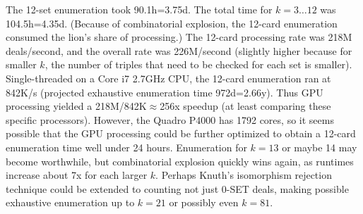 \documentclass[10pt]{amsart}
\begin{document}
The 12-set enumeration took 90.1h=3.75d. The total time for $k=3\ldots 12$ was
104.5h=4.35d. (Because of combinatorial explosion, the 12-card enumeration
consumed the lion's share of processing.) The 12-card processing rate was 218M
deals/second, and the overall rate was 226M/second (slightly higher because for
smaller $k$, the number of triples that need to be checked for each set is
smaller). Single-threaded on a Core i7 2.7GHz CPU, the 12-card enumeration ran
at 842K/s (projected exhaustive enumeration time 972d=2.66y). Thus GPU
processing yielded a 218M/842K$\approx$256x speedup (at least comparing these
specific processors). However, the Quadro P4000 has 1792 cores, so it seems
possible that the GPU processing could be further optimized to obtain a 12-card
enumeration time well under 24 hours. Enumeration for $k=13$ or maybe 14 may
become worthwhile, but combinatorial explosion quickly wins again, as runtimes
increase about 7x for each larger $k$. Perhaps Knuth's isomorphism rejection
technique could be extended to counting not just 0-SET deals, making possible
exhaustive enumeration up to $k=21$ or possibly even $k=81$.
\end{document}
